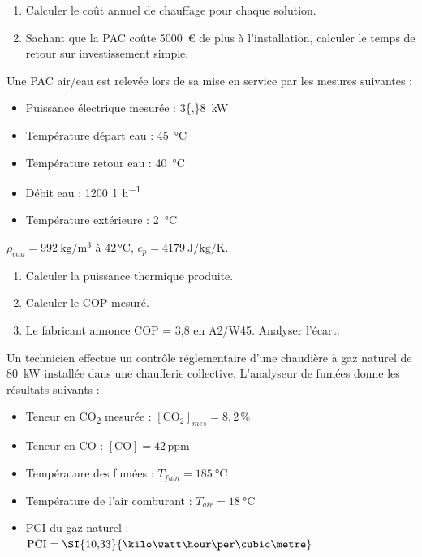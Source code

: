 \begin{enumerate}
  \item Calculer le coût annuel de chauffage pour chaque solution.
  \item Sachant que la PAC coûte \SI{5000}{\euro} de plus à l'installation, calculer le temps de retour sur investissement simple.
\end{enumerate}



Une PAC air/eau est relevée lors de sa mise en service par les mesures suivantes :
\begin{itemize}
  \item Puissance électrique mesurée : \SI{3{,}8}{\kilo\watt}
  \item Température départ eau : \SI{45}{\celsius}
  \item Température retour eau : \SI{40}{\celsius}
  \item Débit eau : \SI{1200}{\litre\per\hour}
  \item Température extérieure : \SI{2}{\celsius}
\end{itemize}
$\rho_{eau} = \SI{992}{\kilogram\per\cubic\metre}$ à 42\,°C, $c_p = \SI{4179}{\joule\per\kilogram\per\kelvin}$.

\begin{enumerate}
  \item Calculer la puissance thermique produite.
  \item Calculer le COP mesuré.
  \item Le fabricant annonce COP = 3,8 en A2/W45. Analyser l'écart.
\end{enumerate}



Un technicien effectue un contrôle réglementaire d'une chaudière à gaz naturel de \SI{80}{\kilo\watt} installée dans une chaufferie collective. L'analyseur de fumées donne les résultats suivants :
\begin{itemize}
  \item Teneur en CO\textsubscript{2} mesurée : $[\text{CO}_2]_{mes} = 8{,}2\,\%$
  \item Teneur en CO : $[\text{CO}] = 42\,\text{ppm}$
  \item Température des fumées : $T_{fum} = \SI{185}{\celsius}$
  \item Température de l'air comburant : $T_{air} = \SI{18}{\celsius}$
  \item PCI du gaz naturel : $\text{PCI} = \SI{10{,}33}{\kilo\watt\hour\per\cubic\metre}$
\end{itemize}


